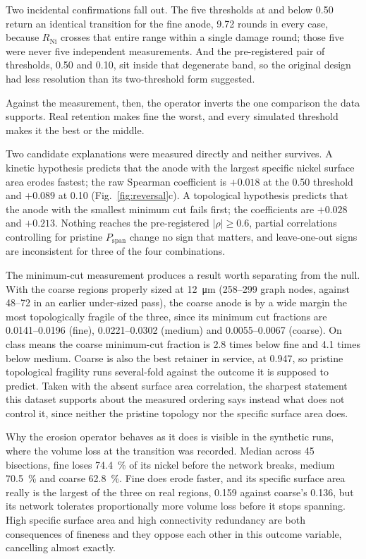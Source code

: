 \documentclass[5p,times,twocolumn]{elsarticle}
\newcommand{\Rni}{R_{\mathrm{Ni}}}
\newcommand{\Pspan}{P_{\mathrm{span}}}
\begin{document}
Two incidental confirmations fall out. The five thresholds at and below 0.50
return an identical transition for the fine anode, 9.72 rounds in every case,
because $\Rni$ crosses that entire range within a single damage round; those
five were never five independent measurements. And the pre-registered pair of
thresholds, 0.50 and 0.10, sit inside that degenerate band, so the original
design had less resolution than its two-threshold form suggested.

Against the measurement, then, the operator inverts the one comparison the data
supports. Real retention makes fine the worst, and every simulated threshold
makes it the best or the middle.

Two candidate explanations were measured directly and neither survives. A
kinetic hypothesis predicts that the anode with the largest specific nickel
surface area erodes fastest; the raw Spearman coefficient is $+0.018$ at the
0.50 threshold and $+0.089$ at 0.10 (Fig.~\ref{fig:reversal}c). A topological
hypothesis predicts that the anode with the smallest minimum cut fails first;
the coefficients are $+0.028$ and $+0.213$. Nothing reaches the pre-registered
$|\rho|\geq0.6$, partial correlations controlling for pristine $\Pspan$ change
no sign that matters, and leave-one-out signs are inconsistent for three of
the four combinations.

The minimum-cut measurement produces a result worth separating from the null.
With the coarse regions properly sized at \SI{12}{\micro\metre}
(\numrange{258}{299} graph nodes, against \numrange{48}{72} in an earlier
under-sized pass), the coarse anode is by a wide margin the most topologically
fragile of the three, since its minimum cut fractions are
\numrange{0.0141}{0.0196} (fine), \numrange{0.0221}{0.0302} (medium) and
\numrange{0.0055}{0.0067} (coarse). On class means the coarse minimum-cut
fraction is 2.8 times below fine and 4.1 times below medium. Coarse is also
the best retainer in service, at 0.947, so pristine topological fragility runs
several-fold against the outcome it is supposed to predict. Taken with the
absent surface
area correlation, the sharpest statement this dataset supports about the
measured ordering says instead what does not control it, since neither the
pristine topology nor the specific surface area does.

Why the erosion operator behaves as it does is visible in the synthetic runs,
where the volume loss at the transition was recorded. Median across 45
bisections, fine loses \SI{74.4}{\percent} of its nickel before the network
breaks, medium \SI{70.5}{\percent} and coarse \SI{62.8}{\percent}. Fine does
erode faster, and its specific surface area really is the largest of the three
on real regions, 0.159 against coarse's 0.136, but its
network tolerates proportionally more volume loss before it stops spanning.
High specific surface area and high connectivity redundancy are both
consequences of fineness and they oppose each other in this outcome variable,
cancelling almost exactly.
\end{document}

